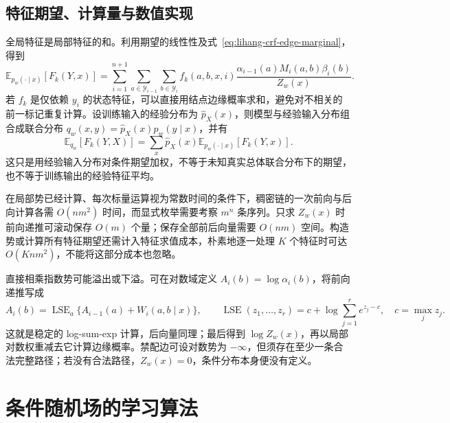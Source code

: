 \subsection{特征期望、计算量与数值实现}
\label{subsec:lihang-crf-expectations}

全局特征是局部特征的和。利用期望的线性性及式~\eqref{eq:lihang-crf-edge-marginal}，得到
\begin{equation}
\label{eq:lihang-crf-feature-expectation}
  \mathbb E_{p_w(\cdot\mid x)}[F_k(Y,x)]
  =\sum_{i=1}^{n+1}\sum_{a\in\mathcal Y_{i-1}}\sum_{b\in\mathcal Y_i}
     f_k(a,b,x,i)
     \frac{\alpha_{i-1}(a)M_i(a,b)\beta_i(b)}{Z_w(x)}.
\end{equation}
若 $f_k$ 是仅依赖 $y_i$ 的状态特征，可以直接用结点边缘概率求和，避免对不相关的前一标记重复计算。设训练输入的经验分布为 $\widehat p_X(x)$，则模型与经验输入分布组合成联合分布 $q_w(x,y)=\widehat p_X(x)p_w(y\mid x)$，并有
\[
  \mathbb E_{q_w}[F_k(Y,X)]
  =\sum_x\widehat p_X(x)\mathbb E_{p_w(\cdot\mid x)}[F_k(Y,x)].
\]
这只是用经验输入分布对条件期望加权，不等于未知真实总体联合分布下的期望，也不等于训练输出的经验特征平均。

在局部势已经计算、每次标量运算视为常数时间的条件下，稠密链的一次前向与后向计算各需 $O(nm^2)$ 时间，而显式枚举需要考察 $m^n$ 条序列。只求 $Z_w(x)$ 时前向递推可滚动保存 $O(m)$ 个量；保存全部前后向量需要 $O(nm)$ 空间。构造势或计算所有特征期望还需计入特征求值成本，朴素地逐一处理 $K$ 个特征时可达 $O(Knm^2)$，不能将这部分成本也忽略。

直接相乘指数势可能溢出或下溢。可在对数域定义 $A_i(b)=\log\alpha_i(b)$，将前向递推写成
\[
  A_i(b)=\operatorname{LSE}_{a}\{A_{i-1}(a)+W_i(a,b\mid x)\},\qquad
  \operatorname{LSE}(z_1,\ldots,z_r)
  =c+\log\sum_{j=1}^r e^{z_j-c},\quad c=\max_j z_j.
\]
这就是稳定的 log-sum-exp 计算，后向量同理；最后得到 $\log Z_w(x)$，再以局部对数权重减去它计算边缘概率。禁配边可设对数势为 $-\infty$，但须存在至少一条合法完整路径；若没有合法路径，$Z_w(x)=0$，条件分布本身便没有定义。

\section{条件随机场的学习算法}
\label{sec:lihang-crf-learning}

